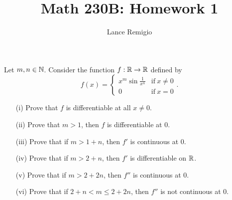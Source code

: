 \documentclass[a4paper]{article}
\title{Math 230B: Homework 1}
\author{Lance Remigio}
\begin{document}
\maketitle

\begin{problem}
    Let \( m,n \in \mathbb{N} \). Consider the function \( f: \mathbb{R} \to \mathbb{R}  \) defined by
    \[  f(x) = 
    \begin{cases}
        x^{m} \sin \frac{ 1 }{ x^{n} } &\text{if} \ x \neq 0 \\
        0 &\text{if} \ x = 0 
    \end{cases}. \]
    \begin{enumerate}
        \item[(i)] Prove that \( f  \) is differentiable at all \( x \neq 0  \).
        \item[(ii)] Prove that \( m > 1   \), then \( f  \) is differentiable at \( 0  \).
        \item[(iii)] Prove that if \( m > 1 + n  \), then \( f'  \) is continuous at \( 0  \).
        \item[(iv)] Prove that if \(  m > 2 + n  \), then \( f'  \) is differentiable on \( \mathbb{R}  \).
        \item[(v)] Prove that if \( m > 2 + 2n  \), then \( f''  \) is continuous at \( 0  \).
        \item[(vi)] Prove that if \( 2 + n < m \leq 2 + 2n \), then \( f''  \) is not continuous at \( 0  \).
    \end{enumerate}
\end{problem}
\end{document}

